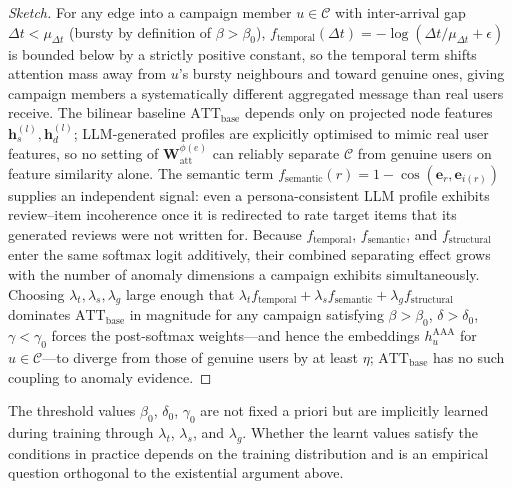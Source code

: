 \begin{proof}[Sketch]
For any edge into a campaign member $u \in \mathcal{C}$ with inter-arrival gap
$\Delta t < \mu_{\Delta t}$ (bursty by definition of $\beta > \beta_0$),
$f_{\mathrm{temporal}}(\Delta t) = -\log(\Delta t/\mu_{\Delta t} + \epsilon)$ is
bounded below by a strictly positive constant, so the temporal term shifts
attention mass away from $u$'s bursty neighbours and toward genuine ones,
giving campaign members a systematically different aggregated message than
real users receive.
The bilinear baseline $\mathrm{ATT}_{\mathrm{base}}$ depends only on projected
node features $\mathbf{h}_s^{(l)}, \mathbf{h}_d^{(l)}$; LLM-generated profiles
are explicitly optimised to mimic real user features, so no setting of
$\mathbf{W}_{\mathrm{att}}^{\phi(e)}$ can reliably separate $\mathcal{C}$ from
genuine users on feature similarity alone.
The semantic term $f_{\mathrm{semantic}}(r) = 1 - \cos(\mathbf{e}_r,
\mathbf{e}_{i(r)})$ supplies an independent signal: even a persona-consistent
LLM profile exhibits review--item incoherence once it is redirected to rate
target items that its generated reviews were not written for.
Because $f_{\mathrm{temporal}}$, $f_{\mathrm{semantic}}$, and
$f_{\mathrm{structural}}$ enter the same softmax logit additively, their
combined separating effect grows with the number of anomaly dimensions a
campaign exhibits simultaneously.
Choosing $\lambda_t, \lambda_s, \lambda_g$ large enough that
$\lambda_t f_{\mathrm{temporal}} + \lambda_s f_{\mathrm{semantic}} +
\lambda_g f_{\mathrm{structural}}$ dominates $\mathrm{ATT}_{\mathrm{base}}$
in magnitude for any campaign satisfying $\beta > \beta_0$, $\delta > \delta_0$,
$\gamma < \gamma_0$ forces the post-softmax weights---and hence the embeddings
$h_u^{\mathrm{AAA}}$ for $u \in \mathcal{C}$---to diverge from those of genuine
users by at least $\eta$; $\mathrm{ATT}_{\mathrm{base}}$ has no such coupling to
anomaly evidence.
\end{proof}

The threshold values $\beta_0$, $\delta_0$, $\gamma_0$ are not fixed a priori
but are implicitly learned during training through $\lambda_t$, $\lambda_s$, and
$\lambda_g$.
Whether the learnt values satisfy the conditions in practice depends on the
training distribution and is an empirical question orthogonal to the
existential argument above.
